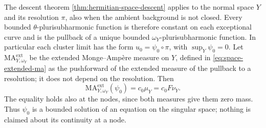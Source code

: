 The descent theorem \cref{thm:hermitian-space-descent} applies to the normal space $Y$ and its resolution $\pi$, also when the ambient background is not closed. Every bounded $\theta$-plurisubharmonic function is therefore constant on each exceptional curve and is the pullback of a unique bounded $\omega_Y$-plurisubharmonic function. In particular each cluster limit has the form $u_0=\psi_0\circ\pi$, with $\sup_Y\psi_0=0$. Let $\mathrm{MA}^{\mathrm{ext}}_{Y,\omega_Y}$ be the extended Monge--Amp\`ere measure on $Y$, defined in \eqref{eq:space-extended-ma} as the pushforward of the extended measure of the pullback to a resolution; it does not depend on the resolution. Then
\begin{equation}\label{eq:nodal-descended-equation}
 \mathrm{MA}^{\mathrm{ext}}_{Y,\omega_Y}(\psi_0)
       =c_0\mu_Y=c_0F\nu_Y.
\end{equation}
The equality holds also at the nodes, since both measures give them zero mass. Thus $\psi_0$ is a bounded solution of an equation on the singular space; nothing is claimed about its continuity at a node.

